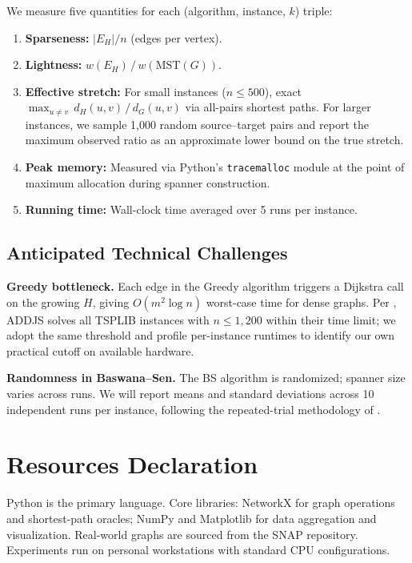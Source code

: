 \documentclass[11pt,a4paper,twocolumn]{article}
\begin{document}
We measure five quantities for each (algorithm, instance, $k$)
triple:

\begin{enumerate}[leftmargin=*, topsep=2pt, itemsep=1pt]
  \item \textbf{Sparseness:} $|E_H|/n$ (edges per vertex).
  \item \textbf{Lightness:}
    $w(E_H)\,/\,w(\mathrm{MST}(G))$.
  \item \textbf{Effective stretch:}
    For small instances ($n \leq 500$), exact
    $\max_{u \neq v}\, d_H(u,v)\,/\,d_G(u,v)$ via all-pairs
    shortest paths. For larger instances, we sample 1,000
    random source--target pairs and report the maximum observed
    ratio as an approximate lower bound on the true stretch.
  \item \textbf{Peak memory:} Measured via Python's
    \texttt{tracemalloc} module at the point of maximum
    allocation during spanner construction.
  \item \textbf{Running time:} Wall-clock time averaged over
    5 runs per instance.
\end{enumerate}

\subsection{Anticipated Technical Challenges}

\textbf{Greedy bottleneck.}
Each edge in the Greedy algorithm triggers a Dijkstra call on
the growing $H$, giving $O(m^2 \log n)$ worst-case time for
dense graphs.
Per \citet{chimani2022spanner}, ADDJS solves all TSPLIB instances
with $n \leq 1{,}200$ within their time limit; we adopt the same
threshold and profile per-instance runtimes to identify our own
practical cutoff on available hardware.

\textbf{Randomness in Baswana--Sen.}
The BS algorithm is randomized; spanner size varies across runs.
We will report means and standard deviations across 10 independent
runs per instance, following the repeated-trial methodology of
\citet{chimani2022spanner}.

\section{Resources Declaration}

Python is the primary language.
Core libraries: NetworkX for graph operations and shortest-path
oracles; NumPy and Matplotlib for data aggregation and
visualization.
Real-world graphs are sourced from the SNAP repository.
Experiments run on personal workstations with standard CPU
configurations.
\end{document}
